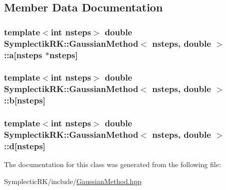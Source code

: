 \subsection{Member Data Documentation}
\hypertarget{classSymplectikRK_1_1GaussianMethod_3_01nsteps_00_01double_01_4_ae3dbf6c82c4e4e5dffaeded9974e31c1}{
\subsubsection[{a}]{\setlength{\rightskip}{0pt plus 5cm}template$<$int nsteps$>$ double {\bf Symplectik\-R\-K\-::\-Gaussian\-Method}$<$ nsteps, double $>$\-::a\mbox{[}nsteps $\ast$nsteps\mbox{]}\hspace{0.3cm}{\ttfamily [protected]}}}\label{classSymplectikRK_1_1GaussianMethod_3_01nsteps_00_01double_01_4_ae3dbf6c82c4e4e5dffaeded9974e31c1}
\hypertarget{classSymplectikRK_1_1GaussianMethod_3_01nsteps_00_01double_01_4_a5d7ececac2522f2cb2f862eabf4307e5}{
\subsubsection[{b}]{\setlength{\rightskip}{0pt plus 5cm}template$<$int nsteps$>$ double {\bf Symplectik\-R\-K\-::\-Gaussian\-Method}$<$ nsteps, double $>$\-::b\mbox{[}nsteps\mbox{]}\hspace{0.3cm}{\ttfamily [protected]}}}\label{classSymplectikRK_1_1GaussianMethod_3_01nsteps_00_01double_01_4_a5d7ececac2522f2cb2f862eabf4307e5}
\hypertarget{classSymplectikRK_1_1GaussianMethod_3_01nsteps_00_01double_01_4_abdb4ef85a32b2c30372f8b7b56d37ac2}{
\subsubsection[{d}]{\setlength{\rightskip}{0pt plus 5cm}template$<$int nsteps$>$ double {\bf Symplectik\-R\-K\-::\-Gaussian\-Method}$<$ nsteps, double $>$\-::d\mbox{[}nsteps\mbox{]}\hspace{0.3cm}{\ttfamily [protected]}}}\label{classSymplectikRK_1_1GaussianMethod_3_01nsteps_00_01double_01_4_abdb4ef85a32b2c30372f8b7b56d37ac2}


The documentation for this class was generated from the following file\-:\begin{DoxyCompactItemize}
\item 
Symplectic\-R\-K/include/\hyperlink{GaussianMethod_8hpp}{Gaussian\-Method.\-hpp}\end{DoxyCompactItemize}
